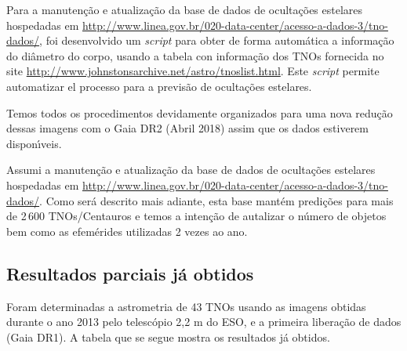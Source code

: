 \documentclass[a4paper, 11pt]{article}
\begin{document}
Para a manutenção e atualização da base de dados de ocultações estelares hospedadas em \url{http://www.linea.gov.br/020-data-center/acesso-a-dados-3/tno-dados/}, foi desenvolvido um \textit{script} para obter de forma automática a informação do diâmetro do corpo, usando a tabela con informação dos TNOs fornecida no site \url{http://www.johnstonsarchive.net/astro/tnoslist.html}. Este \textit{script} permite automatizar el processo para a previsão de ocultações estelares.     


Temos todos os procedimentos devidamente organizados para uma nova redu\c c\~ao dessas imagens com o Gaia DR2 (Abril 2018) assim que os dados estiverem dispon\'{\i}veis.

Assumi a manuten\c c\~ao e atualiza\c c\~ao da base de dados de oculta\c c\~oes estelares hospedadas em \url{http://www.linea.gov.br/020-data-center/acesso-a-dados-3/tno-dados/}. Como ser\'a descrito mais adiante, esta base mant\'em predi\c c\~oes para mais de 2\,600 TNOs/Centauros e temos a inten\c c\~ao de autalizar o n\'umero de objetos bem como as efem\'erides utilizadas 2 vezes ao ano.
\subsection{Resultados parciais já obtidos}

Foram determinadas a astrometria de 43 TNOs usando as imagens obtidas durante o ano 2013 pelo telescópio 2,2 m do ESO, e a primeira liberação de dados (Gaia DR1). A tabela que se segue mostra os resultados já obtidos.  
\end{document}
